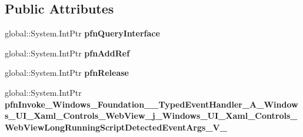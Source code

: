 \subsection*{Public Attributes}
\begin{DoxyCompactItemize}
\item 
\mbox{\label{struct_windows_1_1_foundation_1_1_typed_event_handler___a___windows___u_i___xaml___controls___we097668b3f317b53d2adba6098dff8aa2_abb9ceaf39555de8bc1a8f75be445b5c5}} 
global\+::\+System.\+Int\+Ptr {\bfseries pfn\+Query\+Interface}
\item 
\mbox{\label{struct_windows_1_1_foundation_1_1_typed_event_handler___a___windows___u_i___xaml___controls___we097668b3f317b53d2adba6098dff8aa2_a6cae3f559b99f13755efc46853f28062}} 
global\+::\+System.\+Int\+Ptr {\bfseries pfn\+Add\+Ref}
\item 
\mbox{\label{struct_windows_1_1_foundation_1_1_typed_event_handler___a___windows___u_i___xaml___controls___we097668b3f317b53d2adba6098dff8aa2_a4fcc1ec199ff29e2d95f99f4f88fafb4}} 
global\+::\+System.\+Int\+Ptr {\bfseries pfn\+Release}
\item 
\mbox{\label{struct_windows_1_1_foundation_1_1_typed_event_handler___a___windows___u_i___xaml___controls___we097668b3f317b53d2adba6098dff8aa2_ae2ab8eb8e36d2c47e6eae69242e7f329}} 
global\+::\+System.\+Int\+Ptr {\bfseries pfn\+Invoke\+\_\+\+Windows\+\_\+\+Foundation\+\_\+\+\_\+\+Typed\+Event\+Handler\+\_\+\+A\+\_\+\+Windows\+\_\+\+U\+I\+\_\+\+Xaml\+\_\+\+Controls\+\_\+\+Web\+View\+\_\+j\+\_\+\+Windows\+\_\+\+U\+I\+\_\+\+Xaml\+\_\+\+Controls\+\_\+\+Web\+View\+Long\+Running\+Script\+Detected\+Event\+Args\+\_\+\+V\+\_\+}
\end{DoxyCompactItemize}
